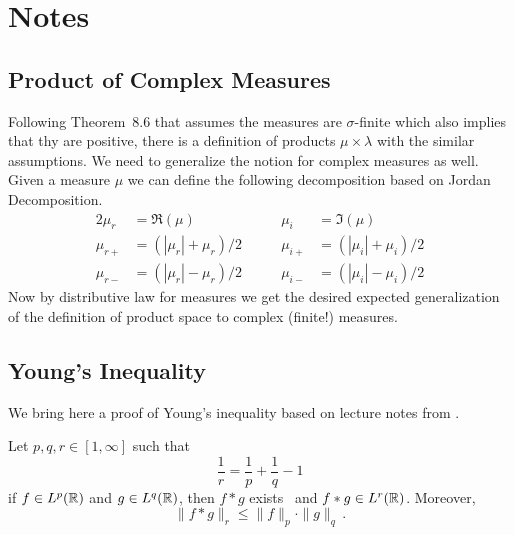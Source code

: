 


\section{Notes}

\subsection{Product of Complex Measures} \label{subsec:prod:complex:measures}

Following Theorem~8.6 that assumes the measures are \(\sigma\)-finite
which also implies that thy are positive, there is 
a definition of products \(\mu\times\lambda\) with the similar assumptions.
We need to generalize the notion for complex measures as well.
Given a measure \(\mu\) we can define the following decomposition
based on 
Jordan Decomposition.
\begin{alignat*}{2}
\mu_{r} &= \Re(\mu) \qquad& \mu_{i} &= \Im(\mu) \\
\mu_{r+} &= (|\mu_r|+\mu_r)/2  \qquad& \mu_{i+} &= (|\mu_i|+\mu_i)/2 \\
\mu_{r-} &= (|\mu_r|-\mu_r)/2  \qquad& \mu_{i-} &= (|\mu_i|-\mu_i)/2
\end{alignat*}
Now by distributive law for measures we get the desired expected generalization
of the definition of product space to complex (finite!) measures.


\subsection{Young's Inequality} \label{subsec:young:ineq}

We bring here a proof of 
Young's inequality based on lecture notes from \cite{Viaclovsky:18125:lec20}.

\begin{lthm}
Let \(p, q, r \in[1,\infty]\) such that
\begin{equation*}
\frac{1}{r} = \frac{1}{p} + \frac{1}{q} - 1
\end{equation*}
if \(f \in L^p(\mathbb{R})\) and \(g\in L^q(\mathbb{R})\), 
then \(f \ast g\) exists \aded\ and \(f\ast g\in L^r(\mathbb{R})\). 
Moreover,
\begin{equation*}
\|f\ast g\|_r \leq \|f\|_p \cdot \|g\|_q\,. \label{eq:young:ineq}
\end{equation*}
\end{lthm}


